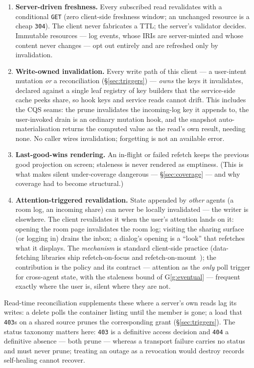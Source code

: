 \documentclass[11pt,a4paper]{article}
\theoremstyle{remark}
\newcommand{\code}[1]{\texttt{#1}}
\begin{document}
\begin{enumerate}
\item \textbf{Server-driven freshness.} Every subscribed read revalidates with a
  conditional \code{GET} (zero client-side freshness window; an unchanged
  resource is a cheap \code{304}). The client never fabricates a TTL; the
  server's validator decides. Immutable resources --- log events, whose IRIs are
  server-minted and whose content never changes --- opt out entirely and are
  refreshed only by invalidation.
\item \textbf{Write-owned invalidation.} Every write path of this client ---
  a user-intent mutation \emph{or} a reconciliation (\S\ref{sec:triggers})
  --- \emph{owns} the keys it invalidates, declared against a single leaf
  registry of key builders that the service-side cache peeks share, so hook
  keys and service reads cannot drift. This includes the CQS seams: the prune
  invalidates the incoming-log key it appends to, the user-invoked drain is an
  ordinary mutation hook, and the snapshot auto-materialisation returns the
  computed value as the read's own result, needing none. No caller wires
  invalidation; forgetting is not an available error.
\item \textbf{Last-good-wins rendering.} An in-flight or failed refetch keeps
  the previous good projection on screen; staleness is never rendered as
  emptiness. (This is what makes silent under-coverage dangerous ---
  \S\ref{sec:coverage} --- and why coverage had to become structural.)
\item \textbf{Attention-triggered revalidation.} State appended by \emph{other}
  agents (a room log, an incoming share) can never be locally invalidated ---
  the writer is elsewhere. The client revalidates it when the user's attention
  lands on it: opening the room page invalidates the room log; visiting the
  sharing surface (or logging in) drains the inbox; a dialog's opening is a
  ``look'' that refetches what it displays. The \emph{mechanism} is standard
  client-side practice (data-fetching libraries ship refetch-on-focus and
  refetch-on-mount~\cite{reactquery}); the contribution is the policy and its
  contract --- attention as the \emph{only} poll trigger for cross-agent
  state, with the staleness bound of G\ref{g:eventual} --- frequent exactly
  where the user is, silent where they are not.
\end{enumerate}

Read-time reconciliation supplements these where a server's own reads lag its
writes: a delete polls the container listing until the member is gone; a load
that \code{403}s on a shared source prunes the corresponding grant
(\S\ref{sec:triggers}). The status taxonomy matters here: \code{403} is a
definitive access decision and \code{404} a definitive absence --- both prune
--- whereas a transport failure carries no status and must never prune;
treating an outage as a revocation would destroy records self-healing cannot
recover.
\end{document}
